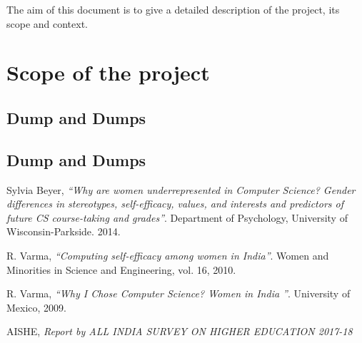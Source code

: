\documentclass[12pt]{article}
\begin{document}
The aim of this document is to give a detailed description of the project, its scope and context.

\newpage
\section{Scope of the project}

\subsection{Dump and Dumps}

\subsection{Dump and Dumps}











\newpage
\begin{thebibliography}{999}

  Sylvia Beyer,
  \emph{“Why are women underrepresented in Computer Science? Gender
differences in stereotypes, self-efficacy, values, and interests and
predictors of future CS course-taking and grades”}.
  Department of Psychology, University of Wisconsin-Parkside.
  2014.

  R. Varma,
  \emph{“Computing self-efficacy among women in India”}.
  Women and Minorities in Science and Engineering, vol. 16,
  2010.
  
  R. Varma,
  \emph{“Why I Chose Computer Science? Women in India ”}.
  University of Mexico,
  2009.
  
  AISHE,
  \emph{Report by ALL INDIA SURVEY ON
HIGHER EDUCATION
2017-18}
  

  

\end{thebibliography}
\end{document}
